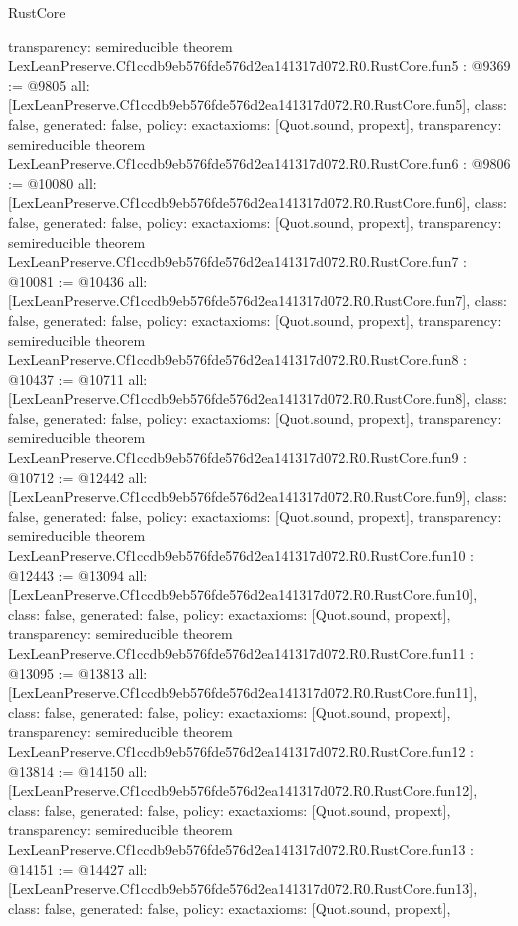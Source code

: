 \begin{lexlean}{RustCore}
\begin{coremodule}
{  transparency: semireducible
}
theorem LexLeanPreserve.Cf1ccdb9eb576fde576d2ea141317d072.R0.RustCore.fun5 : @9369 := @9805 {
  all: [LexLeanPreserve.Cf1ccdb9eb576fde576d2ea141317d072.R0.RustCore.fun5],
  class: false,
  generated: false,
  policy: exact{axioms: [Quot.sound, propext]},
  transparency: semireducible
}
theorem LexLeanPreserve.Cf1ccdb9eb576fde576d2ea141317d072.R0.RustCore.fun6 : @9806 := @10080 {
  all: [LexLeanPreserve.Cf1ccdb9eb576fde576d2ea141317d072.R0.RustCore.fun6],
  class: false,
  generated: false,
  policy: exact{axioms: [Quot.sound, propext]},
  transparency: semireducible
}
theorem LexLeanPreserve.Cf1ccdb9eb576fde576d2ea141317d072.R0.RustCore.fun7 : @10081 := @10436 {
  all: [LexLeanPreserve.Cf1ccdb9eb576fde576d2ea141317d072.R0.RustCore.fun7],
  class: false,
  generated: false,
  policy: exact{axioms: [Quot.sound, propext]},
  transparency: semireducible
}
theorem LexLeanPreserve.Cf1ccdb9eb576fde576d2ea141317d072.R0.RustCore.fun8 : @10437 := @10711 {
  all: [LexLeanPreserve.Cf1ccdb9eb576fde576d2ea141317d072.R0.RustCore.fun8],
  class: false,
  generated: false,
  policy: exact{axioms: [Quot.sound, propext]},
  transparency: semireducible
}
theorem LexLeanPreserve.Cf1ccdb9eb576fde576d2ea141317d072.R0.RustCore.fun9 : @10712 := @12442 {
  all: [LexLeanPreserve.Cf1ccdb9eb576fde576d2ea141317d072.R0.RustCore.fun9],
  class: false,
  generated: false,
  policy: exact{axioms: [Quot.sound, propext]},
  transparency: semireducible
}
theorem LexLeanPreserve.Cf1ccdb9eb576fde576d2ea141317d072.R0.RustCore.fun10 : @12443 := @13094 {
  all: [LexLeanPreserve.Cf1ccdb9eb576fde576d2ea141317d072.R0.RustCore.fun10],
  class: false,
  generated: false,
  policy: exact{axioms: [Quot.sound, propext]},
  transparency: semireducible
}
theorem LexLeanPreserve.Cf1ccdb9eb576fde576d2ea141317d072.R0.RustCore.fun11 : @13095 := @13813 {
  all: [LexLeanPreserve.Cf1ccdb9eb576fde576d2ea141317d072.R0.RustCore.fun11],
  class: false,
  generated: false,
  policy: exact{axioms: [Quot.sound, propext]},
  transparency: semireducible
}
theorem LexLeanPreserve.Cf1ccdb9eb576fde576d2ea141317d072.R0.RustCore.fun12 : @13814 := @14150 {
  all: [LexLeanPreserve.Cf1ccdb9eb576fde576d2ea141317d072.R0.RustCore.fun12],
  class: false,
  generated: false,
  policy: exact{axioms: [Quot.sound, propext]},
  transparency: semireducible
}
theorem LexLeanPreserve.Cf1ccdb9eb576fde576d2ea141317d072.R0.RustCore.fun13 : @14151 := @14427 {
  all: [LexLeanPreserve.Cf1ccdb9eb576fde576d2ea141317d072.R0.RustCore.fun13],
  class: false,
  generated: false,
  policy: exact{axioms: [Quot.sound, propext]},
}
\end{coremodule}
\end{lexlean}
